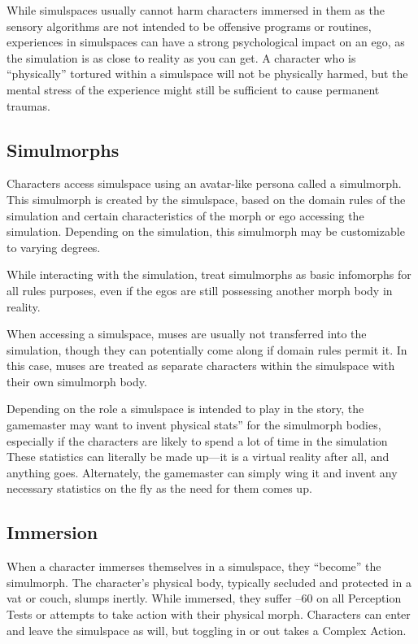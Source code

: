 While simulspaces usually cannot harm characters immersed in them as the sensory algorithms are not intended to be offensive programs or routines, experiences in simulspaces can have a strong psychological impact on an ego, as the simulation is as close to reality as you can get. A character who is ``physically'' tortured within a simulspace will not be physically harmed, but the mental stress of the experience might still be sufficient to cause permanent traumas. 

\subsection{Simulmorphs} 

Characters access simulspace using an avatar-like persona called a simulmorph. This simulmorph is created by the simulspace, based on the domain rules of the simulation and certain characteristics of the morph or ego accessing the simulation. Depending on the simulation, this simulmorph may be customizable to varying degrees. 

While interacting with the simulation, treat simulmorphs as basic infomorphs for all rules purposes, even if the egos are still possessing another morph body in reality. 

When accessing a simulspace, muses are usually not transferred into the simulation, though they can potentially come along if domain rules permit it. In this case, muses are treated as separate characters within the simulspace with their own simulmorph body. 

Depending on the role a simulspace is intended to play in the story, the gamemaster may want to invent physical stats'' for the simulmorph bodies, especially if the characters are likely to spend a lot of time in the simulation These statistics can literally be made up—it is a virtual reality after all, and anything goes. Alternately, the gamemaster can simply wing it and invent any necessary statistics on the fly as the need for them comes up. 

\subsection{Immersion} 

When a character immerses themselves in a simulspace, they ``become'' the simulmorph. The character's physical body, typically secluded and protected in a vat or couch, slumps inertly. While immersed, they suffer –60 on all Perception Tests or attempts to take action with their physical morph. Characters can enter and leave the simulspace as will, but toggling in or out takes a Complex Action. 

